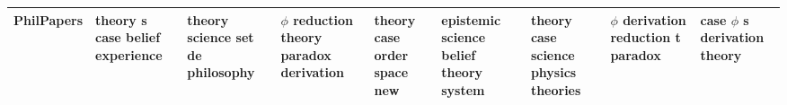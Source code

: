 \documentclass[11pt,a4paper]{article}
\begin{document}
\begin{appendices}
\begin{table*}[htb]
\begin{tiny}
\begin{tabular}{|p{}|p{}|p{}|p{}|p{}|p{}|p{}|p{}|p{}|}
    PhilPapers & theory \newline s \newline case \newline belief \newline experience & theory \newline science \newline set \newline de \newline philosophy & $\phi$ \newline reduction \newline theory \newline paradox \newline derivation & theory \newline case \newline order \newline space \newline new & epistemic \newline science \newline belief \newline theory \newline system & theory \newline case \newline science \newline physics \newline theories & $\phi$ \newline derivation \newline reduction \newline t \newline paradox & case \newline $\phi$ \newline s \newline derivation \newline theory\\\hline

\end{tabular}
\end{tiny}
\end{table*}
\end{appendices}
\end{document}
